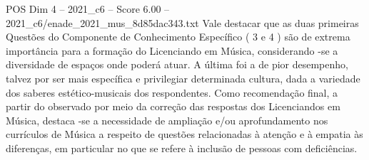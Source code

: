 \begin{textsample}{POS Dim 4 – 2021\_c6 – Score 6.00 – 2021\_c6/enade\_2021\_mus\_8d85dac343.txt}
Vale destacar que as duas primeiras Questões do Componente de Conhecimento Específico ( 3 e 4 ) são de extrema importância para a formação do Licenciando em Música, considerando -se a diversidade de espaços onde poderá atuar.
A última foi a de pior desempenho, talvez por ser mais específica e privilegiar determinada cultura, dada a variedade dos saberes estético-musicais dos respondentes.
Como recomendação final, a partir do observado por meio da correção das respostas dos Licenciandos em Música, destaca -se a necessidade de ampliação e/ou aprofundamento nos currículos de Música a respeito de questões relacionadas à atenção e à empatia às diferenças, em particular no que se refere à inclusão de pessoas com deficiências.

\end{textsample}
